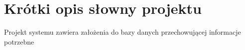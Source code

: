 \section{Krótki opis słowny projektu}
Projekt systemu zawiera założenia do bazy danych przechowującej informacje potrzebne